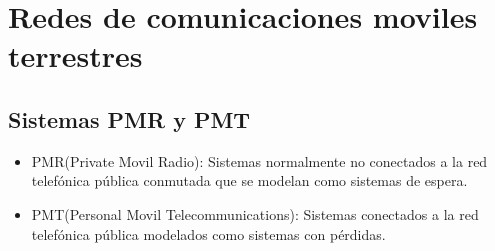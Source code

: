 \section{Redes de comunicaciones moviles terrestres}
\subsection{Sistemas PMR y PMT}
\begin{itemize}
\item{PMR(Private Movil Radio):} Sistemas normalmente no conectados a la red telefónica pública conmutada que se modelan como sistemas de espera.
\item{PMT(Personal Movil Telecommunications):} Sistemas conectados a la red telefónica pública modelados como sistemas con pérdidas. 
\end{itemize}
